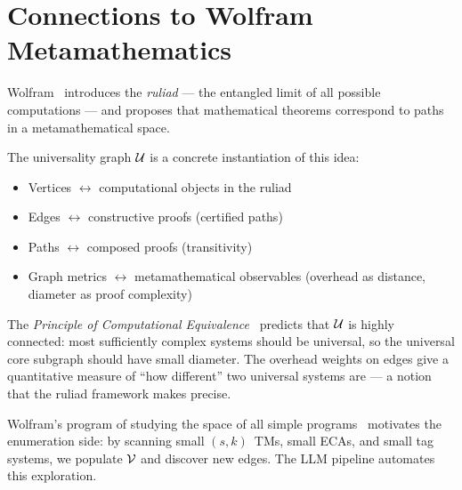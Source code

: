 \chapter{Connections to Wolfram Metamathematics}\label{ch:wolfram}

Wolfram~\cite{wolfram2022physicalization} introduces the \emph{ruliad} --- the
entangled limit of all possible computations --- and proposes that mathematical
theorems correspond to paths in a metamathematical space.

The universality graph $\mathcal{U}$ is a concrete instantiation of this idea:
\begin{itemize}
\item Vertices $\leftrightarrow$ computational objects in the ruliad
\item Edges $\leftrightarrow$ constructive proofs (certified paths)
\item Paths $\leftrightarrow$ composed proofs (transitivity)
\item Graph metrics $\leftrightarrow$ metamathematical observables
  (overhead as distance, diameter as proof complexity)
\end{itemize}

The \emph{Principle of Computational Equivalence}~\cite{wolfram2002nks} predicts
that $\mathcal{U}$ is highly connected: most sufficiently complex systems should be
universal, so the universal core subgraph should have small diameter. The
overhead weights on edges give a quantitative measure of ``how different''
two universal systems are --- a notion that the ruliad framework makes
precise.

Wolfram's program of studying the space of all simple
programs~\cite{wolfram2002nks} motivates the enumeration side: by scanning
small $(s,k)$~TMs, small ECAs, and small tag systems, we populate $\mathcal{V}$ and
discover new edges. The LLM pipeline automates this exploration.
